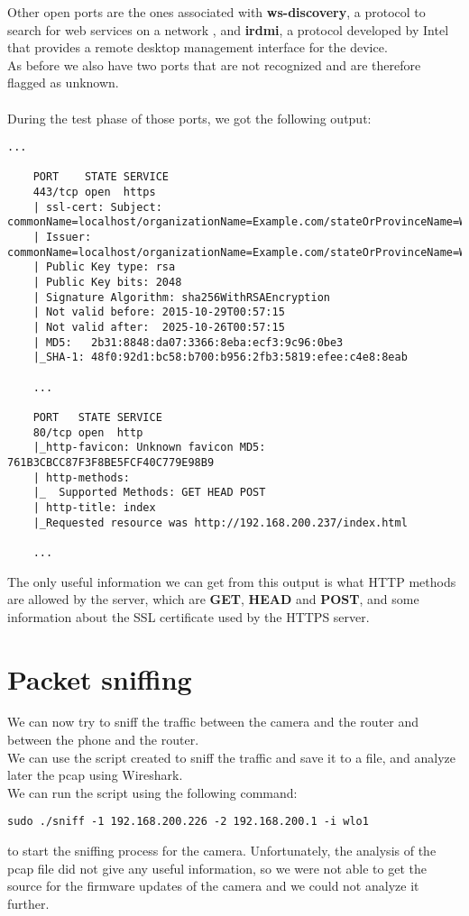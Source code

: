 Other open ports are the ones associated with
\textbf{ws-discovery}, a protocol to search for web services on
a network \cite{ws-discovery}, and \textbf{irdmi}, a protocol developed
by Intel that provides a remote desktop management interface for
the device.\\
As before we also have two ports that are not recognized and are therefore flagged
as unknown.\\\\
During the test phase of those ports, we got the following output:
\begin{lstlisting}[numbers=none]
    ... 

    PORT    STATE SERVICE
    443/tcp open  https
    | ssl-cert: Subject: commonName=localhost/organizationName=Example.com/stateOrProvinceName=Washington/countryName=US
    | Issuer: commonName=localhost/organizationName=Example.com/stateOrProvinceName=Washington/countryName=US
    | Public Key type: rsa
    | Public Key bits: 2048
    | Signature Algorithm: sha256WithRSAEncryption
    | Not valid before: 2015-10-29T00:57:15
    | Not valid after:  2025-10-26T00:57:15
    | MD5:   2b31:8848:da07:3366:8eba:ecf3:9c96:0be3
    |_SHA-1: 48f0:92d1:bc58:b700:b956:2fb3:5819:efee:c4e8:8eab

    ... 

    PORT   STATE SERVICE
    80/tcp open  http
    |_http-favicon: Unknown favicon MD5: 761B3CBCC87F3F8BE5FCF40C779E98B9
    | http-methods: 
    |_  Supported Methods: GET HEAD POST
    | http-title: index
    |_Requested resource was http://192.168.200.237/index.html

    ... 
\end{lstlisting}
The only useful information we can get from this output is what
HTTP methods are allowed by the server, which are \textbf{GET}, \textbf{HEAD} and \textbf{POST}, 
and some information about the SSL certificate used by the HTTPS server.\\
\section{Packet sniffing}
We can now try to sniff the traffic between the camera and the router and between
the phone and the router.\\
We can use the script created to sniff the traffic and save it to a file, and
analyze later the pcap using Wireshark.\\
We can run the script using the following command:
\begin{lstlisting}[numbers=none]
    sudo ./sniff -1 192.168.200.226 -2 192.168.200.1 -i wlo1
\end{lstlisting}
to start the sniffing process for the camera. Unfortunately, the analysis of the
pcap file did not give any useful information, so we were not able to get the source
for the firmware updates of the camera and we could not analyze it further. 
\newpage